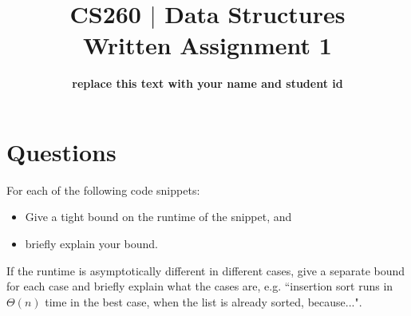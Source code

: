 \documentclass[answers,addpoints,11pt]{exam}
\title{\textbf{CS260 $|$ Data Structures\\Written Assignment 1}}
\author{\textbf{replace this text with your name and student id}}
\date{}
\begin{document}
\maketitle

\section{Questions}
\begin{questions}
\question

For each of the following code snippets:

\begin{itemize}
\item Give a tight bound on the runtime of the snippet, and
\item briefly explain your bound.
\end{itemize}

If the runtime is asymptotically different in different cases, give a separate bound for each case and briefly explain what the cases are, e.g. ``insertion sort runs in $\Theta(n)$ time in the best case, when the list is already sorted, because...".


\end{questions}
\end{document}
